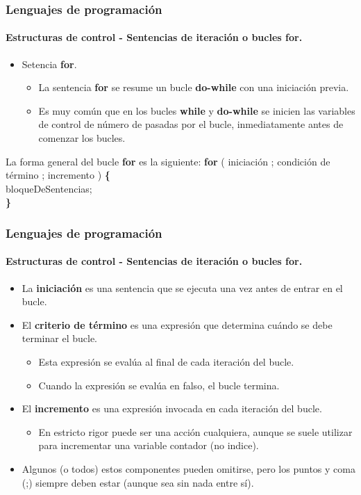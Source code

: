 \documentclass{beamer}
\begin{document}
		\begin{frame}
			\frametitle{Lenguajes de programaci\'on}
			\framesubtitle{Estructuras de control - Sentencias de iteraci\'on o bucles \textbf{for}.}

			\begin{itemize}
				\item Setencia \textbf{for}.
				\begin{itemize}
					\item La sentencia \textbf{for} se resume un bucle \textbf{do-while} con una iniciaci\'on previa.
					\item Es muy com\'un que en los bucles \textbf{while} y \textbf{do-while} se inicien las variables de control de n\'umero de pasadas por el bucle, inmediatamente antes de comenzar los bucles.
				\end{itemize}
			\end{itemize}

			\begin{block}{La forma general del bucle \textbf{for} es la siguiente:}
				{\scriptsize
				\textbf{for} ( iniciaci\'on ; condici\'on de t\'ermino ; incremento ) \textbf{\{} \\
				\hspace{0.3cm} bloqueDeSentencias; \\
				\textbf{\}} 
				}
			\end{block}
		\end{frame}

		\begin{frame}
			\frametitle{Lenguajes de programaci\'on}
			\framesubtitle{Estructuras de control - Sentencias de iteraci\'on o bucles \textbf{for}.}

			\begin{itemize}
				\item La \textbf{iniciaci\'on} es una sentencia que se ejecuta una vez antes de entrar en el bucle.
				\item El \textbf{criterio de t\'ermino} es una expresi\'on que determina cu\'ando se debe terminar el bucle.
				\begin{itemize}
					\item Esta expresi\'on se eval\'ua al final de cada iteraci\'on del bucle.
					\item Cuando la expresi\'on se eval\'ua en falso, el bucle termina.
				\end{itemize}
				\item El \textbf{incremento} es una expresi\'on invocada en cada iteraci\'on del bucle.
				\begin{itemize}
					\item En estricto rigor puede ser una acci\'on cualquiera, aunque se suele utilizar para incrementar una variable contador (no indice).
				\end{itemize}
				\item Algunos (o todos) estos componentes pueden omitirse, pero los puntos y coma (;) siempre deben estar (aunque sea sin nada entre s\'i).
			\end{itemize}
		\end{frame}		
						
\end{document}
